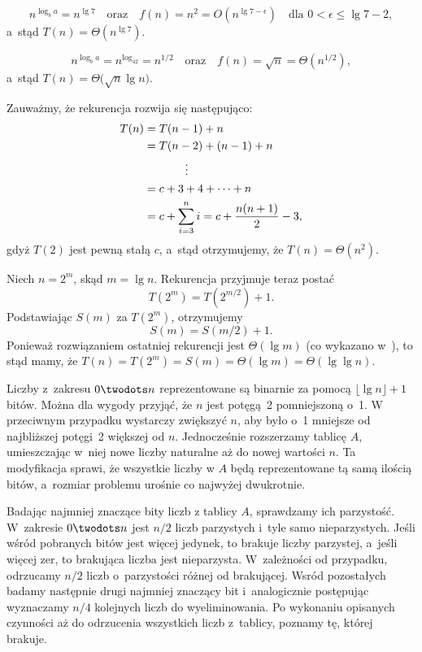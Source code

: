 \subproblem %
\[
	n^{\log_ba} = n^{\lg7} \quad\text{oraz}\quad f(n) = n^2 = O(n^{\lg7-\epsilon}) \quad\text{dla $0<\epsilon\le\lg7-2$},
\]
a~stąd $T(n)=\Theta(n^{\lg7})$.

\subproblem %
\[
	n^{\log_ba} = n^{\log_42} = n^{1/2} \quad\text{oraz}\quad f(n) = \sqrt{n} = \Theta(n^{1/2}),
\]
a~stąd $T(n)=\Theta\bigl(\!\sqrt{n}\lg n\bigr)$.

\subproblem %
Zauważmy, że rekurencja rozwija się następująco:
\begin{align*}
	T(n) &= T(n-1)+n \\
	&= T(n-2)+(n-1)+n \\
	&\hspace{.5in}\vdots \\
	&= c+3+4+\cdots+n \\
	&= c+\sum_{i=3}^ni = c+\frac{n(n+1)}{2}-3,
\end{align*}
gdyż $T(2)$ jest pewną stałą $c$, a~stąd otrzymujemy, że $T(n)=\Theta(n^2)$.

\subproblem %
Niech $n=2^m$, skąd $m=\lg n$. Rekurencja przyjmuje teraz postać
\[
	T(2^m) = T(2^{m/2})+1.
\]
Podstawiając $S(m)$ za $T(2^m)$, otrzymujemy
\[
	S(m) = S(m/2)+1.
\]
Ponieważ rozwiązaniem ostatniej rekurencji jest $\Theta(\lg m)$ (co wykazano w~), to stąd mamy, że $T(n)=T(2^m)=S(m)=\Theta(\lg m)=\Theta(\lg\lg n)$.

Liczby z~zakresu $0\twodots n$ reprezentowane są binarnie za pomocą $\lfloor\lg n\rfloor+1$ bitów. Można dla wygody przyjąć, że $n$ jest potęgą~2 pomniejszoną o~1. W przeciwnym przypadku wystarczy zwiększyć $n$, aby było o~1 mniejsze od najbliższej potęgi~2 większej od $n$. Jednocześnie rozszerzamy tablicę $A$, umieszczając w~niej nowe liczby naturalne aż do nowej wartości $n$. Ta modyfikacja sprawi, że wszystkie liczby w $A$ będą reprezentowane tą samą ilością bitów, a~rozmiar problemu urośnie co najwyżej dwukrotnie.

Badając najmniej znaczące bity liczb z tablicy $A$, sprawdzamy ich parzystość. W~zakresie $0\twodots n$ jest $n/2$ liczb parzystych i~tyle samo nieparzystych. Jeśli wśród pobranych bitów jest więcej jedynek, to brakuje liczby parzystej, a~jeśli więcej zer, to brakująca liczba jest nieparzysta. W~zależności od przypadku, odrzucamy $n/2$ liczb o~parzystości różnej od brakującej. Wsród pozostałych badamy następnie drugi najmniej znaczący bit i~analogicznie postępując wyznaczamy $n/4$ kolejnych liczb do wyeliminowania. Po wykonaniu opisanych czynności aż do odrzucenia wszystkich liczb z~tablicy, poznamy tę, której brakuje.

